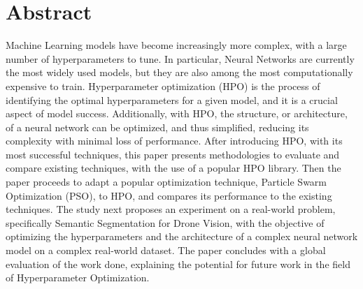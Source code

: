 \chapter*{\Large \center Abstract}

Machine Learning models have become increasingly more complex, with a large number of hyperparameters to tune. In particular, Neural Networks are currently the most widely used models, but they are also among the most computationally expensive to train.
Hyperparameter optimization (HPO) is the process of identifying the optimal hyperparameters for a given model, and it is a crucial aspect of model success. Additionally, with HPO, the structure, or architecture, of a neural network can be optimized, and thus simplified, reducing its complexity with minimal loss of performance.
After introducing HPO, with its most successful techniques, this paper presents methodologies to evaluate and compare existing techniques, with the use of a popular HPO library.
Then the paper proceeds to adapt a popular optimization technique, Particle Swarm Optimization (PSO), to HPO, and compares its performance to the existing techniques.
The study next proposes an experiment on a real-world problem, specifically Semantic Segmentation for Drone Vision, with the objective of optimizing the hyperparameters and the architecture of a complex neural network model on a complex real-world dataset.
The paper concludes with a global evaluation of the work done, explaining the potential for future work in the field of Hyperparameter Optimization.